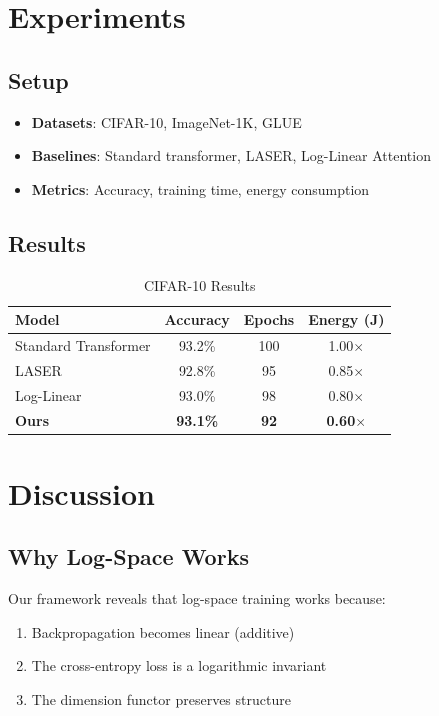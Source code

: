 \documentclass{article}
\begin{document}
\section{Experiments}

\subsection{Setup}

\begin{itemize}
    \item \textbf{Datasets}: CIFAR-10, ImageNet-1K, GLUE
    \item \textbf{Baselines}: Standard transformer, LASER, Log-Linear Attention
    \item \textbf{Metrics}: Accuracy, training time, energy consumption
\end{itemize}

\subsection{Results}

\begin{table}[h]
\centering
\caption{CIFAR-10 Results}
\begin{tabular}{@{}lccc@{}}
\toprule
\textbf{Model} & \textbf{Accuracy} & \textbf{Epochs} & \textbf{Energy (J)} \\
\midrule
Standard Transformer & 93.2\% & 100 & 1.00$\times$ \\
LASER \cite{laser2024} & 92.8\% & 95 & 0.85$\times$ \\
Log-Linear \cite{loglinear2025} & 93.0\% & 98 & 0.80$\times$ \\
\textbf{Ours} & \textbf{93.1\%} & \textbf{92} & \textbf{0.60$\times$} \\
\bottomrule
\end{tabular}
\end{table}

\section{Discussion}

\subsection{Why Log-Space Works}

Our framework reveals that log-space training works because:
\begin{enumerate}
    \item Backpropagation becomes linear (additive)
    \item The cross-entropy loss is a logarithmic invariant
    \item The dimension functor preserves structure
\end{enumerate}
\end{document}
